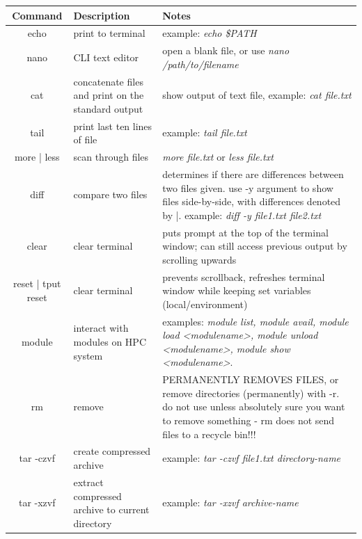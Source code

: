\documentclass[12pt]{article}
\begin{document}
\begin{table}[H]
\begin{changemargin}{-1.5cm}{-1.5cm}
\centering
{\renewcommand{\arraystretch}{1.4}%
\begin{tabular}{|c|C{4.5cm}|C{9.5cm}|}
\hline
\textbf{Command} & \textbf{Description} & \textbf{Notes} \\
\hline
echo & print to terminal & example: \textit{echo \$PATH}\\
nano & CLI text editor & open a blank file, or use \textit{nano /path/to/filename} \\
cat & concatenate files and print on the standard output & show output of text file, example: \textit{cat file.txt} \\
tail & print last ten lines of file & example: \textit{tail file.txt} \\
more | less & scan through files & \textit{more file.txt} or \textit{less file.txt} \\ 
diff & compare two files & determines if there are differences between two files given. use -y argument to show files side-by-side, with differences denoted by |. example: \textit{diff -y file1.txt file2.txt} \\
clear & clear terminal & puts prompt at the top of the terminal window; can still access previous output by scrolling upwards \\
reset | tput reset & clear terminal & prevents scrollback, refreshes terminal window while keeping set variables (local/environment) \\
module & interact with modules on HPC system & examples: \textit{module list, module avail, module load <modulename>, module unload <modulename>, module show <modulename>}. \\
rm & remove & PERMANENTLY REMOVES FILES, or remove directories (permanently) with -r. do not use unless absolutely sure you want to remove something - rm does not send files to a recycle bin!!! \\
tar -czvf & create compressed archive & example: \textit{tar -czvf file1.txt directory-name} \\
tar -xzvf & extract compressed archive to current directory & example: \textit{tar -xzvf archive-name} \\

\hline
\end{tabular}
}
\end{changemargin}
\end{table}
\newpage
\end{document}
